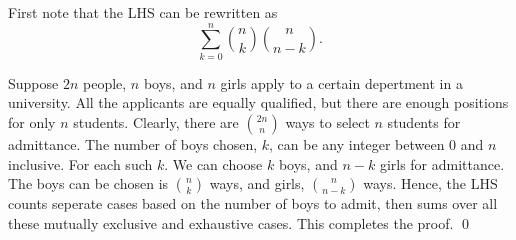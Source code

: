 \documentclass[12pt]{article}
\begin{document}
First note that the LHS can be rewritten as 
$$\sum_{k=0}^n {n\choose k}{n\choose n-k}.$$

Suppose $2n$ people, $n$ boys, and $n$ girls apply to a certain depertment in a university. All the applicants are equally qualified, but there are enough positions for only $n$ students. Clearly, there are ${2n\choose n}$ ways to select $n$ students for admittance. The number of boys chosen, $k$, can be any integer between 0 and $n$ inclusive. For each such $k$. We can choose $k$ boys, and $n-k$ girls for admittance. The boys can be chosen is ${n\choose k}$ ways, and girls, ${n\choose n-k}$ ways. Hence, the LHS counts seperate cases based on the number of boys to admit, then sums over all these mutually exclusive and exhaustive cases. This completes the proof. \qed
\end{document}
